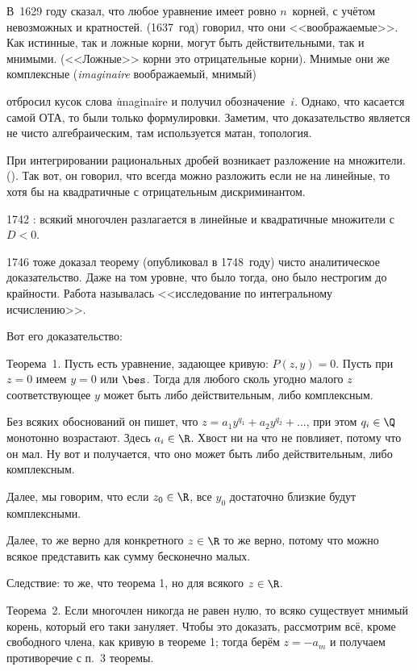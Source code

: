 \documentclass[a4paper,oneside,fleqn,10pt]{article}
\begin{document}
В~1629 году  сказал, что любое
уравнение имеет ровно $n$~корней, с учётом невозможных и
кратностей.  (1637~год) говорил, что они
<<воображаемые>>.  Как истинные, так и ложные корни, могут быть
действительными, так и мнимыми.  (<<Ложные>> корни это отрицательные
корни). Мнимые они же комплексные (\emph{imaginaire} воображаемый,
мнимый)

 отбросил кусок слова \emph{i}maginaire и получил
обозначение~$i$.  Однако, что касается самой ОТА, то были только
формулировки. Заметим, что доказательство является не чисто
алгебраическим, там используется матан, топология.

При интегрировании рациональных дробей возникает разложение на
множители.  (). Так вот, он говорил, что всегда можно
разложить если не на линейные, то хотя бы на квадратичные с
отрицательным дискриминантом.

1742 : всякий многочлен разлагается в линейные и
квадратичные множители с $D < 0$.

1746  тоже доказал теорему (опубликовал в 1748~году)
чисто аналитическое доказательство. Даже на том уровне, что было
тогда, оно было нестрогим до крайности.  Работа называлась
<<исследование по интегральному исчислению>>.

Вот его доказательство:

Теорема~1. Пусть есть уравнение, задающее кривую: $P(z,y) = 0$.  Пусть
при $z = 0$ имеем $y = 0$ или $\bes$.  Тогда для любого сколь угодно
малого $z$ соответствующее $y$ может быть либо действительным, либо
комплексным.

Без всяких обоснований он пишет, что $z = a_1 y^{q_1} + a_2 y^{q_2}+
\ldots$, при этом $q_i \in \Q$ монотонно возрастают. Здесь $a_i \in
\R$.  Хвост ни на что не повлияет, потому что он мал. Ну вот и
получается, что оно может быть либо действительным, либо комплексным.

Далее, мы говорим, что если $z_0 \in \R$, все $y_0$ достаточно близкие
будут комплексными.

Далее, то же верно для конкретного $z \in \R$ то же верно, потому что
можно всякое представить как сумму бесконечно малых.

Следствие: то же, что теорема 1, но для всякого $z \in \R$.

Теорема~2. Если многочлен никогда не равен нулю, то всяко существует
мнимый корень, который его таки зануляет.  Чтобы это доказать,
рассмотрим всё, кроме свободного члена, как кривую в теореме 1; тогда
берём $z = -a_m$ и получаем противоречие с п.~3 теоремы.
\end{document}
